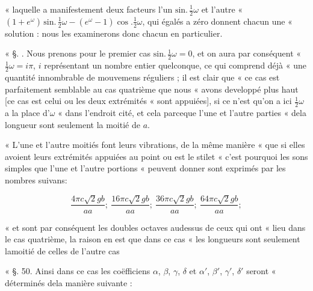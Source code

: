 \documentclass[11pt,a4paper]{article}
\begin{document}
« laquelle a manifestement deux facteurs l'un
$\text{sin.}\,\frac{1}{2}\omega$ et l'autre «
$(1+e^{\omega})\,\text{sin.}\,\frac{1}{2}\omega-(e^{\omega}-1)\cos.\frac{1}{2}\omega$,
qui égalés a zéro donnent chacun une « solution : nous les examinerons donc
chacun en particulier.

« §. . Nous prenons pour le premier cas
$\text{sin.}\,\frac{1}{2}\omega=0$, et on aura par conséquent «
$\frac{1}{2}\omega=i\pi$, $i$ représentant un nombre entier quelconque, ce
qui comprend déjà « une quantité innombrable de mouvemens réguliers ; il est
clair que « ce cas est parfaitement semblable au cas quatrième que nous «
avons developpé plus haut [ce cas est celui ou les deux extrémités « sont
appuiées], si ce n'est qu'on a ici $\frac{1}{2}\omega$ a la place d'$\omega$
« dans l'endroit cité, et cela parceque l'une et l'autre parties « dela
longueur sont seulement la moitié de $a$.



« L'une et l'autre moitiés font leurs vibrations, de la même manière « que si
elles avoient leurs extrémités appuiées au point ou est le stilet « c'est
pourquoi les sons simples que l'une et l'autre portions « peuvent donner sont
exprimés par les nombres suivans:

\[ \frac{4\pi c\surd 2gb}{aa};\ \frac{16\pi c\surd 2gb}{aa};\ \frac{36\pi c\surd 2gb}{aa};\ \frac{64\pi c\surd 2gb}{aa}; \]

« et sont par conséquent les doubles octaves audessus de ceux qui ont « lieu
dans le cas quatrième, la raison en est que dans ce cas « les longueurs sont
seulement lamoitié de celles de l'autre cas

« §. 50. Ainsi dans ce cas les coëfficiens $\alpha$, $\beta$, $\gamma$,
$\delta$ et $\alpha'$, $\beta'$, $\gamma'$, $\delta'$ seront « déterminés
dela manière suivante :
\end{document}
